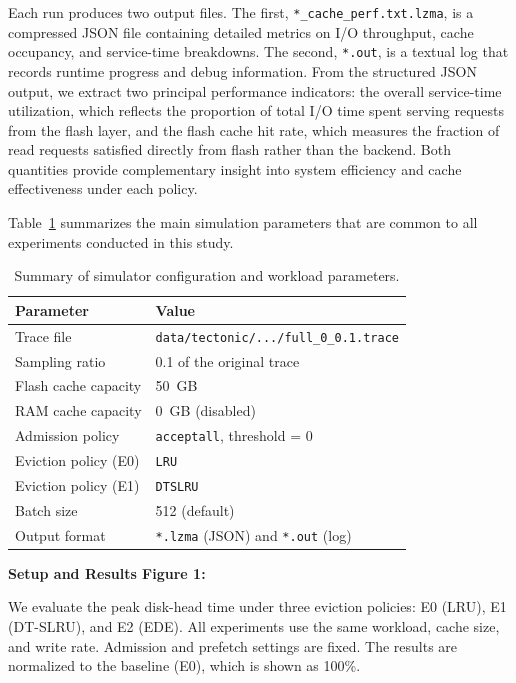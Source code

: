 Each run produces two output files. The first, \verb|*_cache_perf.txt.lzma|, is a compressed JSON file containing detailed metrics on I/O throughput, cache occupancy, and service-time breakdowns. The second, \verb|*.out|, is a textual log that records runtime progress and debug information. From the structured JSON output, we extract two principal performance indicators: the overall service-time utilization, which reflects the proportion of total I/O time spent serving requests from the flash layer, and the flash cache hit rate, which measures the fraction of read requests satisfied directly from flash rather than the backend. Both quantities provide complementary insight into system efficiency and cache effectiveness under each policy.

Table~\ref{tab:setup} summarizes the main simulation parameters that are common to all experiments conducted in this study.

\begin{table}[h]
\centering
\small
\caption{Summary of simulator configuration and workload parameters.}
\label{tab:setup}
\begin{tabular}{ll}
\toprule
\textbf{Parameter} & \textbf{Value} \\
\midrule
Trace file & \verb|data/tectonic/.../full_0_0.1.trace| \\
Sampling ratio & 0.1 of the original trace \\
Flash cache capacity & 50~GB \\
RAM cache capacity & 0~GB (disabled) \\
Admission policy & \texttt{acceptall}, threshold = 0 \\
Eviction policy (E0) & \texttt{LRU} \\
Eviction policy (E1) & \texttt{DTSLRU} \\
Batch size & 512 (default) \\
Output format & \texttt{*.lzma} (JSON) and \texttt{*.out} (log) \\
\bottomrule
\end{tabular}
\end{table}

\textbf{Setup and Results Figure 1:}



We evaluate the peak disk-head time under three eviction policies: E0 (LRU), E1 (DT-SLRU), and E2 (EDE).
All experiments use the same workload, cache size, and write rate. Admission and prefetch settings are fixed.
The results are normalized to the baseline (E0), which is shown as 100\%.

